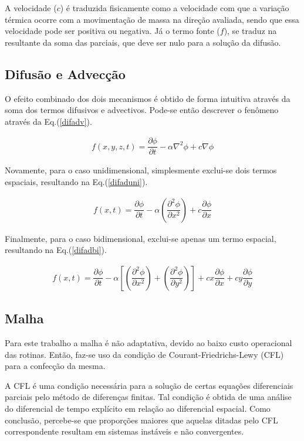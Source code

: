 	A velocidade ($c$) é traduzida fisicamente como a velocidade com que a variação térmica ocorre com a movimentação de massa na direção avaliada, sendo que essa velocidade pode ser positiva ou negativa. Já o termo fonte ($f$), se traduz na resultante da soma das parciais, que deve ser nulo para a solução da difusão.

\subsection{Difusão e Advecção}
\noindent

	O efeito combinado dos dois mecanismos é obtido de forma intuitiva através da soma dos termos difusivos e advectivos. Pode-se então descrever o fenômeno através da Eq.(\ref{difadv}).
	
\begin{align}
\label{difadv}
f(x,y,z,t) = \dfrac{\partial \phi}{\partial t} - \alpha \nabla^2 \phi + c \nabla \phi
\end{align}

	Novamente, para o caso unidimensional, simplesmente exclui-se dois termos espaciais, resultando na Eq.(\ref{difaduni}).

\begin{align}
\label{difaduni}
f(x,t) = \dfrac{\partial \phi}{\partial t} - \alpha \left(\dfrac{\partial^2 \phi}{\partial x^2}\right) + c \dfrac{\partial \phi}{\partial x}
\end{align}	

	Finalmente, para o caso bidimensional, exclui-se apenas um termo espacial, resultando na Eq.(\ref{difadbi}).

\begin{align}
\label{difadbi}
f(x,t) = \dfrac{\partial \phi}{\partial t} - \alpha \left[ \left(\dfrac{\partial^2 \phi}{\partial x^2}\right) + \left(\dfrac{\partial^2 \phi}{\partial y^2}\right)\right] + cx \dfrac{\partial \phi}{\partial x} + cy \dfrac{\partial \phi}{\partial y}
\end{align}	
	
\subsection{Malha}
\noindent

	Para este trabalho a malha é não adaptativa, devido ao baixo custo operacional das rotinas. Então, faz-se uso da condição de Courant-Friedrichs-Lewy (CFL) para a confecção da mesma.
	
	A CFL é uma condição necessária para a solução de certas equações diferenciais parciais pelo método de diferenças finitas. Tal condição é obtida de uma análise do diferencial de tempo explícito em relação ao diferencial espacial. Como conclusão, percebe-se que proporções maiores que aquelas ditadas pelo CFL correspondente resultam em sistemas instáveis e não convergentes.
	
